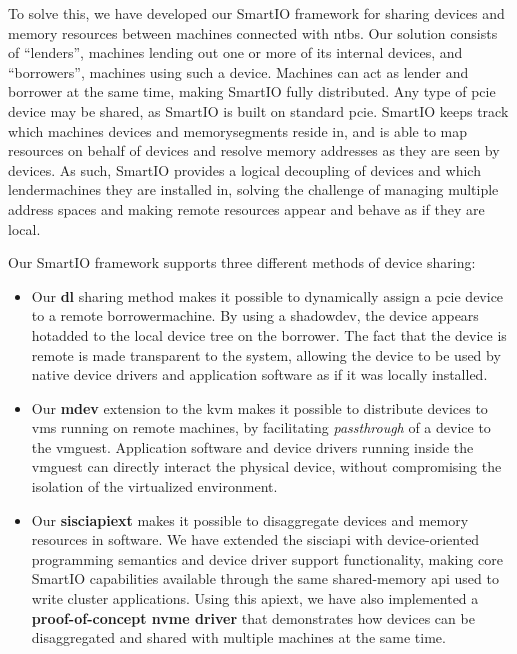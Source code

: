 To solve this, we have developed our SmartIO framework for sharing devices and memory resources between machines connected with \glspl{ntb}.
%
Our solution consists of ``\glspl{lender}'', machines lending out one or more of its internal devices, and ``\glspl{borrower}'', machines using such a device.
%
Machines can act as \gls{lender} and \gls{borrower} at the same time, making SmartIO fully distributed.
%
Any type of \gls{pcie} device may be shared, as SmartIO is built on standard \gls{pcie}.
%
SmartIO keeps track which machines devices and \glspl{memorysegment} reside in, and is able to map resources on behalf of devices and resolve memory addresses as they are seen by devices.
%
As such, SmartIO provides a logical decoupling of devices and which \glspl{lendermachine} they are installed in, solving the challenge of managing multiple address spaces and making remote resources appear and behave as if they are local.




Our SmartIO framework supports three different methods of device sharing:
%
\begin{itemize}
    \item Our \textbf{\gls{dl}} sharing method makes it possible to dynamically assign a \gls{pcie} device to a remote \gls{borrowermachine}.
        By using a \gls{shadowdev}, the device appears \gls{hotadded} to the local device tree on the \gls{borrower}.
        The fact that the device is remote is made transparent to the system, allowing the device to be used by native device drivers and application software as if it was locally installed.


    \item Our \textbf{\gls{mdev}} extension to the \gls{kvm} makes it possible to distribute devices to \glspl{vm} running on remote machines, by facilitating \emph{\gls{passthrough}} of a device to the \gls{vmguest}.
        Application software and device drivers running inside the \gls{vmguest} can directly interact the physical device, without compromising the isolation of the virtualized environment.


    \item Our \textbf{\gls{sisciapiext}} makes it possible to \gls{disaggregate} devices and memory resources in software.
        We have extended the \gls{sisciapi} with device-oriented programming semantics and device driver support functionality, making core SmartIO capabilities available through the same shared-memory \gls{api} used to write cluster applications.
        Using this \gls{apiext}, we have also implemented a \textbf{proof-of-concept \gls{nvme} driver} that demonstrates how devices can be \gls{disaggregated} and shared with multiple machines at the same time.
        
\end{itemize}



